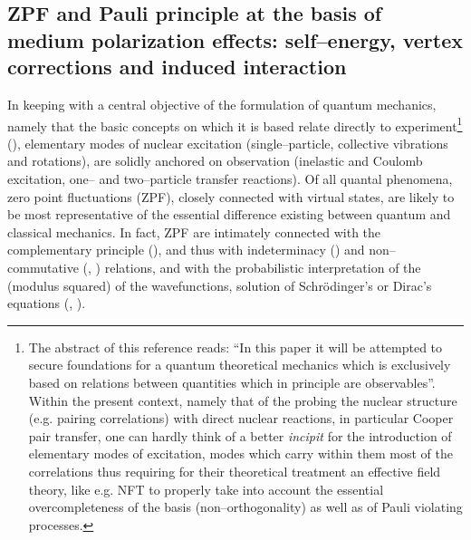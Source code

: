 \begin{subappendices}
\section[ZPF and Pauli principle]{ZPF and Pauli principle at the basis of medium polarization effects: self--energy, vertex corrections and induced interaction}\label{C7AppA}
In keeping with a central objective of the formulation of quantum mechanics, namely that the basic concepts on which it is based relate directly to experiment\footnote{The abstract of this reference reads: ``In this paper it will be attempted to secure foundations for a quantum theoretical mechanics which is exclusively based on relations between quantities which in principle are observables''. Within the present context, namely that of the probing the nuclear structure (e.g. pairing correlations) with direct nuclear reactions, in particular Cooper pair transfer, one can hardly think of a better \emph{incipit} for the introduction of elementary modes of excitation, modes which carry within them most of the correlations  thus requiring for their theoretical treatment an effective field theory, like e.g. NFT to  properly take into account the essential overcompleteness of the basis (non--orthogonality) as well as of Pauli violating processes.} (\cite{Heisenberg:25}), elementary modes of nuclear excitation (single--particle, collective vibrations and rotations), are solidly anchored on observation (inelastic and Coulomb excitation, one-- and two--particle transfer reactions). Of all quantal phenomena, zero point fluctuations (ZPF), closely connected with virtual states, are likely to be most representative of the essential difference existing between quantum and classical mechanics. In fact, ZPF are intimately connected with the complementary principle (\cite{Bohr:28}), and thus with  indeterminacy (\cite{Heisenberg:27}) and non--commutative (\cite{Born:25a}, \cite{Born:25b}) relations, and with the probabilistic interpretation \citep{Born:26} of the (modulus squared) of the wavefunctions, solution of Schr\"odinger's or Dirac's equations (\cite{Schrodinger:25}, \cite{Dirac:26}).
 \begin{figure}[h!]
 	\begin{center}

\end{center}
\end{figure}
\end{subappendices}
